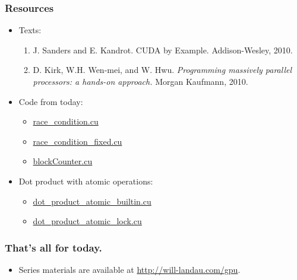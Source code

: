 \documentclass[handout]{beamer}
\numberwithin{equation}{section}
\begin{document}
\begin{frame}
\frametitle{Resources} \small

\begin{itemize}
\item Texts:
\begin{enumerate}
 \item J. Sanders and E. Kandrot. {CUDA by Example.} Addison-Wesley, 2010.
\pause \item D. Kirk, W.H. Wen-mei, and W. Hwu. \emph{Programming massively parallel processors: a hands-on approach.} Morgan Kaufmann, 2010.
\end{enumerate}
\pause \item Code from today:
\begin{itemize}
\item \href{http://will-landau.com/gpu/Code/CUDA_C/race_condition/race_condition.cu}{race\_condition.cu}
\item \href{http://will-landau.com/gpu/Code/CUDA_C/race_condition_fixed/race_condition_fixed.cu}{race\_condition\_fixed.cu}
\item \href{http://will-landau.com/gpu/Code/CUDA_C/blockCounter/blockCounter.cu}{blockCounter.cu}
\end{itemize}
\pause \item Dot product with atomic operations:
\begin{itemize}
\item \href{http://will-landau.com/gpu/Code/CUDA_C/dot_product_atomic_builtin/dot_product_atomic_builtin.cu}{dot\_product\_atomic\_builtin.cu}
\item \href{http://will-landau.com/gpu/Code/CUDA_C/dot_product_atomic_lock/dot_product_atomic_lock.cu}{dot\_product\_atomic\_lock.cu}
\end{itemize}
\end{itemize}
\end{frame}


\begin{frame}
\frametitle{That's all for today.}
\begin{itemize}
\item Series materials are available at \url{http://will-landau.com/gpu}.
\end{itemize}
\end{frame}
\end{document}
